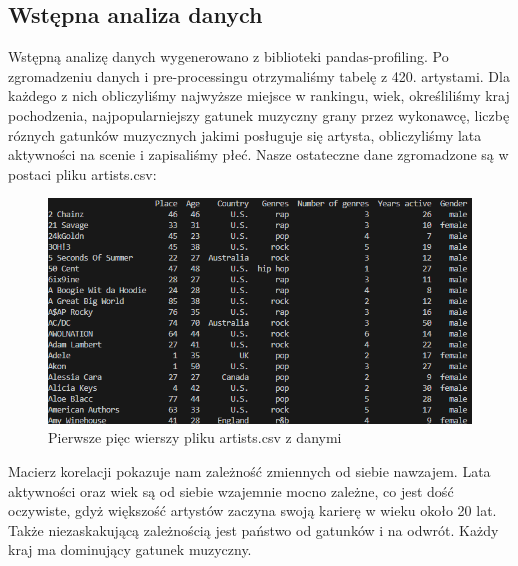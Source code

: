 \documentclass[12pt, letterpaper]{article}
\begin{document}
\subsection{Wstępna analiza danych}
Wstępną analizę danych wygenerowano z biblioteki pandas-profiling.
Po zgromadzeniu danych i pre-processingu otrzymaliśmy tabelę z 420. artystami. Dla każdego z nich obliczyliśmy najwyższe miejsce w rankingu, wiek, określiliśmy kraj pochodzenia, najpopularniejszy gatunek muzyczny grany przez wykonawcę, liczbę róznych gatunków muzycznych jakimi posługuje się artysta, obliczyliśmy lata aktywności na scenie i zapisaliśmy płeć. Nasze ostateczne dane zgromadzone są w postaci pliku artists.csv:                                                                                                                                                                                                                                                                                                                                                                                                       
\begin{figure}[h]
    \centering
    \includegraphics[width=1\textwidth]{data_head}  
    \caption{Pierwsze pięc wierszy pliku artists.csv z danymi}
\end{figure}

Macierz korelacji pokazuje nam zależność zmiennych od siebie nawzajem. Lata aktywności oraz wiek są od siebie wzajemnie mocno zależne, co jest dość oczywiste, gdyż większość artystów zaczyna swoją karierę w wieku około 20 lat. Także niezaskakującą zależnością jest państwo od gatunków i na odwrót. Każdy kraj ma dominujący gatunek muzyczny.
\end{document}
